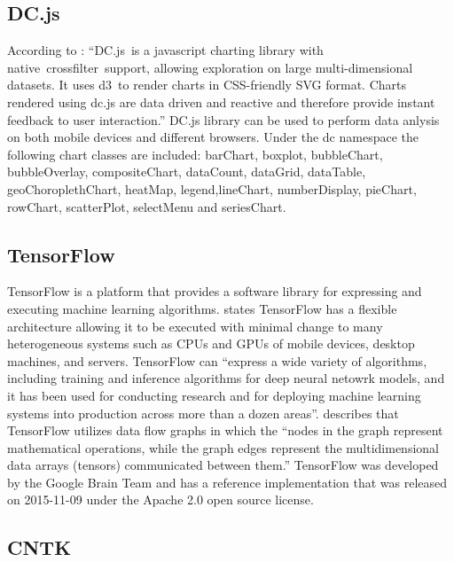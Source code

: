 \subsection{DC.js}

    According to \cite{www-dcjs}: ``DC.js is a javascript charting
    library with native crossfilter support, allowing exploration on
    large multi-dimensional datasets. It uses d3 to render charts in
    CSS-friendly SVG format. Charts rendered using dc.js are data
    driven and reactive and therefore provide instant feedback to user
    interaction.'' DC.js library can be used to perform data anlysis
    on both mobile devices and different browsers. Under the dc
    namespace the following chart classes are included: barChart,
    boxplot, bubbleChart, bubbleOverlay, compositeChart, dataCount,
    dataGrid, dataTable, geoChoroplethChart, heatMap,
    legend,lineChart, numberDisplay, pieChart, rowChart, scatterPlot,
    selectMenu and seriesChart.
      
\subsection{TensorFlow}

    TensorFlow is a platform that provides a software library for
    expressing and executing machine learning
    algorithms. \cite{tensorflow-paper-2016} states TensorFlow has a
    flexible architecture allowing it to be executed with minimal
    change to many heterogeneous systems such as CPUs and GPUs of mobile
    devices, desktop machines, and servers. TensorFlow can ``express a
    wide variety of algorithms, including training and inference
    algorithms for deep neural netowrk models, and it has been used
    for conducting research and for deploying machine learning systems
    into production across more than a dozen
    areas''. \cite{www-tensorflow} describes that TensorFlow utilizes
    data flow graphs in which the ``nodes in the graph represent
    mathematical operations, while the graph edges represent the
    multidimensional data arrays (tensors) communicated between them.''
    TensorFlow was developed by the Google Brain Team and has a
    reference implementation that was released on 2015-11-09 under the
    Apache 2.0 open source license.
    
\subsection{CNTK}

